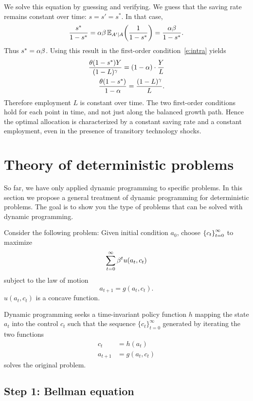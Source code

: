 \documentclass[letterpaper, 11pt, leqno]{article}
\begin{document}
We solve this equation by guessing and verifying. We guess that the saving rate remains constant over time: $s=s'=s^*$. In that case, 
\begin{equation*}
\frac{s^*}{1-s^*}=\a \b \E[A'\mid A]{\frac{1}{1-s^*}}=\frac{\a \b}{1-s^*}.
\end{equation*}
Thus $s^* =\alpha \beta$. Using this result in the first-order condition~\eqref{e:intra} yields
\begin{align*}
\frac{\theta (1-s^*) Y}{(1-L)^{\gamma}} =(1-\alpha)\cdot \frac{Y}{L}\\
\frac{\theta (1-s^*)}{1-\alpha} = \frac{(1-L)^{\gamma}}{L}.
\end{align*}
Therefore employment $L$ is constant over time. The two first-order conditions hold for each point in time, and not just along the balanced growth path. Hence the optimal allocation is characterized by a constant saving rate and a constant employment, even in the presence of transitory technology shocks.

\section{Theory of deterministic problems}\label{sec:theory}

So far, we have only applied dynamic programming to specific problems. In this section we propose a general treatment of dynamic programming for deterministic problems. The goal is to show you the type of problems that can be solved with dynamic programming.

Consider the following problem: Given initial condition $a_{0}$, choose $\left\lbrace c_{t} \right\rbrace_{t=0}^{\infty}$ to maximize
\begin{equation*}
\sum_{t=0}^{\infty}\beta^{t} u(a_{t},c_{t})
\end{equation*}
subject to the law of motion
\begin{equation*}
a_{t+1}=g(a_{t},c_{t}).
\end{equation*}
$u(a_{t},c_{t})$ is a concave function. 

Dynamic programming seeks a time-invariant policy function $h$ mapping the state $a_{t}$ into the control $c_{t}$ such that the sequence
$\{c_{t}\}_{t=0}^{\infty}$ generated by iterating the two functions
\begin{align*}
c_{t} & =h(a_{t}) \\
a_{t+1} & =g(a_{t},c_{t})
\end{align*}
solves the original problem.

\subsection{Step 1: Bellman equation}
\end{document}

